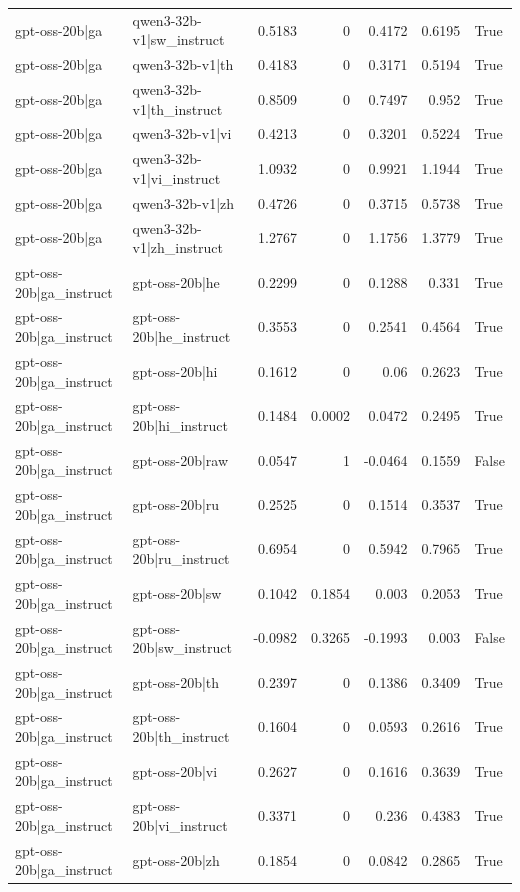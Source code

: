 \begin{table}
\begin{tabular}{l l r r r r l}
gpt-oss-20b|ga & qwen3-32b-v1|sw_instruct & 0.5183 & 0 & 0.4172 & 0.6195 & True \\
gpt-oss-20b|ga & qwen3-32b-v1|th & 0.4183 & 0 & 0.3171 & 0.5194 & True \\
gpt-oss-20b|ga & qwen3-32b-v1|th_instruct & 0.8509 & 0 & 0.7497 & 0.952 & True \\
gpt-oss-20b|ga & qwen3-32b-v1|vi & 0.4213 & 0 & 0.3201 & 0.5224 & True \\
gpt-oss-20b|ga & qwen3-32b-v1|vi_instruct & 1.0932 & 0 & 0.9921 & 1.1944 & True \\
gpt-oss-20b|ga & qwen3-32b-v1|zh & 0.4726 & 0 & 0.3715 & 0.5738 & True \\
gpt-oss-20b|ga & qwen3-32b-v1|zh_instruct & 1.2767 & 0 & 1.1756 & 1.3779 & True \\
gpt-oss-20b|ga_instruct & gpt-oss-20b|he & 0.2299 & 0 & 0.1288 & 0.331 & True \\
gpt-oss-20b|ga_instruct & gpt-oss-20b|he_instruct & 0.3553 & 0 & 0.2541 & 0.4564 & True \\
gpt-oss-20b|ga_instruct & gpt-oss-20b|hi & 0.1612 & 0 & 0.06 & 0.2623 & True \\
gpt-oss-20b|ga_instruct & gpt-oss-20b|hi_instruct & 0.1484 & 0.0002 & 0.0472 & 0.2495 & True \\
gpt-oss-20b|ga_instruct & gpt-oss-20b|raw & 0.0547 & 1 & -0.0464 & 0.1559 & False \\
gpt-oss-20b|ga_instruct & gpt-oss-20b|ru & 0.2525 & 0 & 0.1514 & 0.3537 & True \\
gpt-oss-20b|ga_instruct & gpt-oss-20b|ru_instruct & 0.6954 & 0 & 0.5942 & 0.7965 & True \\
gpt-oss-20b|ga_instruct & gpt-oss-20b|sw & 0.1042 & 0.1854 & 0.003 & 0.2053 & True \\
gpt-oss-20b|ga_instruct & gpt-oss-20b|sw_instruct & -0.0982 & 0.3265 & -0.1993 & 0.003 & False \\
gpt-oss-20b|ga_instruct & gpt-oss-20b|th & 0.2397 & 0 & 0.1386 & 0.3409 & True \\
gpt-oss-20b|ga_instruct & gpt-oss-20b|th_instruct & 0.1604 & 0 & 0.0593 & 0.2616 & True \\
gpt-oss-20b|ga_instruct & gpt-oss-20b|vi & 0.2627 & 0 & 0.1616 & 0.3639 & True \\
gpt-oss-20b|ga_instruct & gpt-oss-20b|vi_instruct & 0.3371 & 0 & 0.236 & 0.4383 & True \\
gpt-oss-20b|ga_instruct & gpt-oss-20b|zh & 0.1854 & 0 & 0.0842 & 0.2865 & True \\

\end{tabular}
\end{table}
